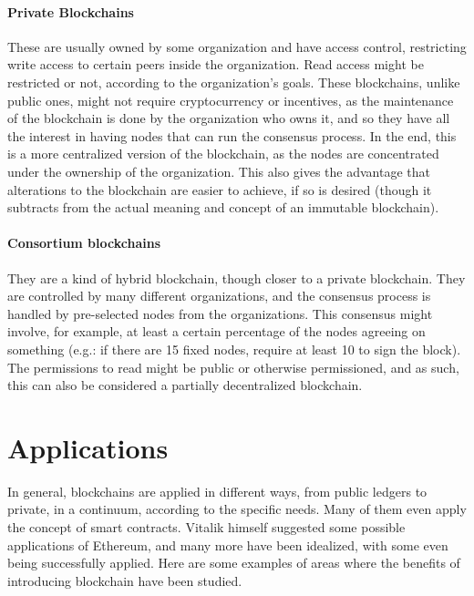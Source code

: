     \paragraph{Private Blockchains} These are usually owned by some organization and have access control, restricting write access to certain peers inside the organization. Read access might be restricted or not, according to the organization's goals. These blockchains, unlike public ones, might not require cryptocurrency or incentives, as the maintenance of the blockchain is done by the organization who owns it, and so they have all the interest in having nodes that can run the consensus process. In the end, this is a more centralized version of the blockchain, as the nodes are concentrated under the ownership of the organization. This also gives the advantage that alterations to the blockchain are easier to achieve, if so is desired (though it subtracts from the actual meaning and concept of an immutable blockchain).
    
    \paragraph{Consortium blockchains} They are a kind of hybrid blockchain, though closer to a private blockchain. They are controlled by many different organizations, and the consensus process is handled by pre-selected nodes from the organizations. This consensus might involve, for example, at least a certain percentage of the nodes agreeing on something (e.g.: if there are 15 fixed nodes, require at least 10 to sign the block). The permissions to read might be public or otherwise permissioned, and as such, this can also be considered a partially decentralized blockchain.



\section{Applications}

    In general, blockchains are applied in different ways, from public ledgers to private, in a continuum, according to the specific needs. Many of them even apply the concept of smart contracts. Vitalik himself suggested some possible applications of Ethereum, and many more have been idealized, with some even being successfully applied. Here are some examples of areas where the benefits of introducing blockchain have been studied.
    

